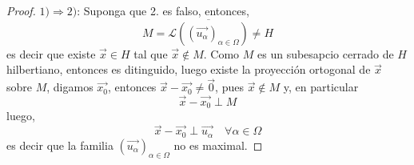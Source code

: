 \documentclass[12pt]{report}
\newcounter{it}
\theoremstyle{largebreak}
\begin{document}
    \begin{proof}
        $1)\Rightarrow 2)$: Suponga que 2. es falso, entonces,
        \begin{equation*}
            M=\overline{\mathcal{L}\left(\left(\vec{u_\alpha} \right)_{\alpha\in\Omega}\right)}\neq H
        \end{equation*}
        es decir que existe $\vec{x}\in H$ tal que $\vec{x}\notin M$. Como $M$ es un subesapcio cerrado de $H$ hilbertiano, entonces es ditinguido, luego existe la proyección ortogonal de $\vec{x}$ sobre $M$, digamos $\vec{x_0}$, entonces $\vec{x}-\vec{x_0}\neq\vec{0}$, pues $\vec{x}\notin M$ y, en particular
        \begin{equation*}
            \vec{x}-\vec{x_0}\perp M
        \end{equation*}
        luego,
        \begin{equation*}
            \vec{x}-\vec{x_0}\perp\vec{u_\alpha}\quad\forall\alpha\in\Omega
        \end{equation*}
        es decir que la familia $\left(\vec{u_\alpha} \right)_{\alpha\in\Omega}$ no es maximal.


\end{proof}
\end{document}
